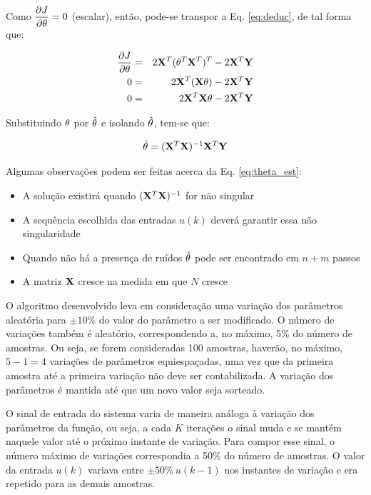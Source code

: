 Como $\displaystyle\frac{\partial J}{\partial \mathbf{\theta}} = 0$ (escalar), então,
pode-se transpor a Eq. \ref{eq:deduc}, de tal forma que:

\begin{eqnarray}
\frac{\partial J}{\partial \mathbf{\theta}} & = & 
2\mathbf{X}^T(\mathbf{\theta}^T\mathbf{X}^T)^T - 2\mathbf{X}^T\mathbf{Y}\nonumber\\
0 & = & 2\mathbf{X}^T(\mathbf{X\theta}) - 2\mathbf{X}^T\mathbf{Y}\nonumber\\
0 & = & 2\mathbf{X}^T\mathbf{X\theta} - 2\mathbf{X}^T\mathbf{Y}
\end{eqnarray}

Substituindo $\mathbf{\theta}$ por $\hat{\mathbf{\theta}}$ e isolando
$\hat{\mathbf{\theta}}$, tem-se que:

\begin{equation}\label{eq:theta_est}
\hat{\mathbf{\theta}} = (\mathbf{X}^T\mathbf{X})^{-1} \mathbf{X}^T\mathbf{Y}
\end{equation}

Algumas observações podem ser feitas acerca da Eq. \ref{eq:theta_est}:

\begin{itemize}
    \item A solução existirá quando $(\mathbf{X}^T\mathbf{X})^{-1}$ for não singular
    \item A sequência escolhida das entradas $u(k)$ deverá garantir essa
          não singularidade
    \item Quando não há a presença de ruídos $\hat{\mathbf{\theta}}$ pode ser
          encontrado em $n+m$ passos
    \item A matriz $\mathbf{X}$ cresce na medida em que $N$ cresce
\end{itemize}

O algoritmo desenvolvido leva em consideração uma variação dos parâmetros
aleatória para $\pm 10\%$ do valor do parâmetro a ser modificado. O número de
variações também é aleatório, correspondendo a, no máximo, 5\% do número de
amostras. Ou seja, se forem consideradas 100 amostras, haverão, no máximo, $5-1
= 4$ variações de parâmetros equiespaçadas, uma vez que da primeira amostra até
a primeira variação não deve ser contabilizada. A variação dos parâmetros é
mantida até que um novo valor seja sorteado.

O sinal de entrada do sistema varia de maneira análoga à variação dos parâmetros
da função, ou seja, a cada $K$ iterações o sinal muda e se mantém naquele valor
até o próximo instante de variação. Para compor esse sinal, o número máximo de
variações correspondia a 50\% do número de amostras. O valor da entrada $u(k)$
variava entre $\pm 50\%\ u(k-1)$ nos instantes de variação e era repetido para as
demais amostras.

